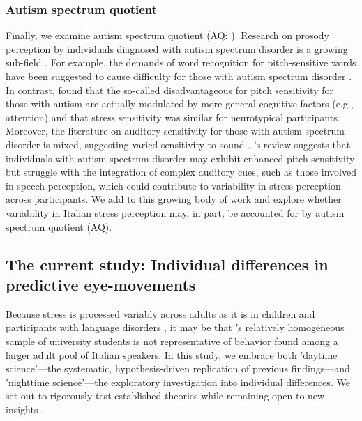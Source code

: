 \subsubsection{Autism spectrum quotient}
Finally, we examine autism spectrum quotient (AQ: \cite{Baron-Cohen2001}). Research on prosody perception by individuals diagnosed with autism spectrum disorder is a growing sub-field \citep[see ][]{Grice2023, Paul2005, McCann2003}. For example, the demands of word recognition for pitch-sensitive words have been suggested to cause difficulty for those with autism spectrum disorder \citep{schelinski2020speech}. In contrast, \cite{grossman2023relationship} found that the so-called disadvantageous for pitch sensitivity for those with autism are actually modulated by more general cognitive factors (e.g., attention) and that stress sensitivity was similar for neurotypical participants. Moreover, the literature on auditory sensitivity for those with autism spectrum disorder is mixed, suggesting varied sensitivity to sound \citep{Kuiper2019, Stiegler2010}. \cite{haesen2011review}'s review suggests that individuals with autism spectrum disorder may exhibit enhanced pitch sensitivity but struggle with the integration of complex auditory cues, such as those involved in speech perception, which could contribute to variability in stress perception across participants. We add to this growing body of work and explore whether variability in Italian stress perception may, in part, be accounted for by autism spectrum quotient (AQ).



\subsection{The current study: Individual differences in predictive eye-movements}
Because stress is processed variably across adults as it is in children \citep[e.g.,][]{Colombo2014} and participants with language disorders \citep[e.g.,][]{Cappa1997}, it may be that \cite{Sulpizio_McQueen_2012}'s relatively homogeneous sample of university students is not representative of behavior found among a larger adult pool of Italian speakers. In this study, we embrace both 'daytime science'—the systematic, hypothesis-driven replication of previous findings—and 'nighttime science'—the exploratory investigation into individual differences. We set out to rigorously test established theories while remaining open to new insights \citep{Yanai2020}.

